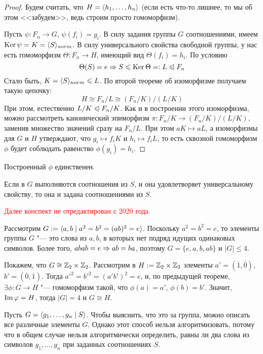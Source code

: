 \begin{proof}
	Будем считать, что $H = \langle h_1, \ldots, h_n \rangle$ (если есть что-то лишнее, то мы об этом <<забудем>>, ведь строим просто гомоморфизм).
	
	Пусть $\psi \colon F_n \to G$, $\psi(f_i) = g_i$. В силу задания группы $G$ соотношениями, имеем $\operatorname{Ker}\psi = K = \langle S \rangle_{norm}$. В силу универсального свойства свободной группы, у нас есть гомоморфизм $\Theta \colon F_n \to H$, имеющий вид $\Theta(f_i) = h_i$. По условию
	\[
		\Theta(S) = e \Rightarrow S \leqslant \operatorname{Ker}\Theta =: L \trianglelefteqslant F_n
	\]
	Стало быть, $K = \langle S \rangle_{norm} \leqslant L$. По второй теореме об изоморфизме получаем такую цепочку:
	\[
		H \cong F_n / L \cong (F_n / K) / (L / K)
	\]
	При этом, естественно $L / K \trianglelefteqslant F_n / K$. Как и в построении этого изоморфизма, можно рассмотреть канонический эпиморфизм $\pi \colon F_n / K \to (F_n / K) / (L / K)$, заменив множество значений сразу на $F_n / L$. При этом $aK \mapsto aL$, а изоморфизмы для $G$ и $H$ утверждают, что $g_i \mapsto f_i K$ и $h_i \mapsto f_i L$, то есть сквозной гомоморфизм $\phi$ будет соблюдать равенство $\phi(g_i) = h_i$.
\end{proof}

\begin{note}
	Построенный $\phi$ единственен.
\end{note}

\begin{exercise}
	Если в $G$ выполняются соотношения из $S$, и она удовлетворяет универсальному свойству, то она и задана соотношениями из $S$.
\end{exercise}

\textcolor{red}{Далее конспект не отредактирован с 2020 года.}

\begin{example}
	Рассмотрим $G := \langle a, b\mid a^2=b^2=(ab)^2 = e\rangle$. Поскольку $a^2 = b^2 = e$, то элементы группы $G$ "--- это слова из $a, b$, в которых нет подряд идущих одинаковых символов. Более того, $abab = e \ra ab \hm= ba$, поэтому $G = \{e, a, b, ab\}$ и $|G| \le 4$.
	
	Покажем, что $G \cong \mathbb{Z}_2\times\mathbb{Z}_2$. Рассмотрим в $H := \mathbb{Z}_2\times\mathbb{Z}_2$ элементы $a' = (\overline{1}, \overline{0})$, $b' = (\overline{0}, \overline{1})$. Тогда $a'^2 = b'^2 = (a'b')^2 = e$, и, по предыдущей теореме, $\exists \phi: G \to H$ "--- гомоморфизм такой, что $\phi(a) = a'$, $\phi(b) = b'$. Значит, $\operatorname{Im}\varphi = H$, тогда $|G| = 4$ и $G \cong H$.
\end{example}

\begin{note}
	Пусть $G = \langle g_1, \ldots, g_n\mid S\rangle$. Чтобы выяснить, что это за группа, можно описать все различные элементы $G$. Однако этот способ нельзя алгоритмизовать, потому что в общем случае нельзя алгоритмически определить, равны ли два слова из символов $g_1, \ldots, g_n$ при заданных соотношениях $S$.
\end{note}